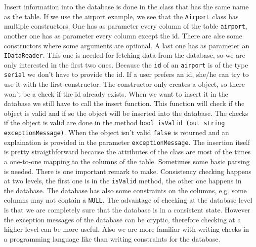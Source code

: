 Insert information into the database is done in the class that has the same name as the table. If we use the airport example, we see that the \texttt{Airport} class has multiple constructors. One has as parameter every column of the table \texttt{airport}, another one has as parameter every column except the id. There are alse some constructors where some arguments are optional.
A last one has as parameter an  \texttt{IDataReader}. This one is needed for fetching data from the database, so we are only interested in the first two ones. Because the \texttt{id} of an \texttt{airport} is of the type \texttt{serial} we don't have to provide the id. If a user prefers an id, she/he can try to use it with the first constructor. The constructor only creates a \Csh object, so there won't be a check if the id already exists. When we want to insert it in the database we still have to call the insert function. This function will check if the object is valid and if so the object will be inserted into the database. The checks if the object is valid are done in the method \texttt{bool isValid (out string exceptionMessage)}. When the object isn't valid \texttt{false} is returned and an explaination is provided in the parameter \texttt{exceptionMessage}. The insertion itself is pretty straigthforward because the attributes of the class are most of the times a one-to-one mapping to the columns of the table. Sometimes some basic parsing is needed. There is one important remark to make. Consistency checking happens at two levels, the first one is in the \texttt{isValid} method, the other one happens in the database. The database has also some constraints on the columns, e.g. some columns may not contain a \texttt{NULL}. The advantage of checking at the database level is that we are completely sure that the database is in a consistent state. However the exception messages of the database can be cryptic, therefore checking at a higher level can be more useful. Also we are more familiar with writing checks in a programming language like \Csh than writing constraints for the database.